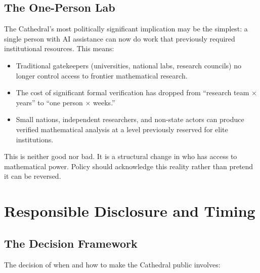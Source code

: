 \documentclass[11pt,a4paper]{article}
\begin{document}
\subsection{The One-Person Lab}

The Cathedral's most politically significant implication may be the
simplest: a single person with AI assistance can now do work that
previously required institutional resources. This means:

\begin{itemize}
  \item Traditional gatekeepers (universities, national labs,
    research councils) no longer control access to frontier
    mathematical research.
  \item The cost of significant formal verification has dropped from
    ``research team $\times$ years'' to ``one person $\times$ weeks.''
  \item Small nations, independent researchers, and non-state actors
    can produce verified mathematical analysis at a level previously
    reserved for elite institutions.
\end{itemize}

This is neither good nor bad. It is a structural change in who
has access to mathematical power. Policy should acknowledge this
reality rather than pretend it can be reversed.

\section{Responsible Disclosure and Timing}
\label{sec:timing}

\subsection{The Decision Framework}

The decision of when and how to make the Cathedral public involves:
\end{document}
